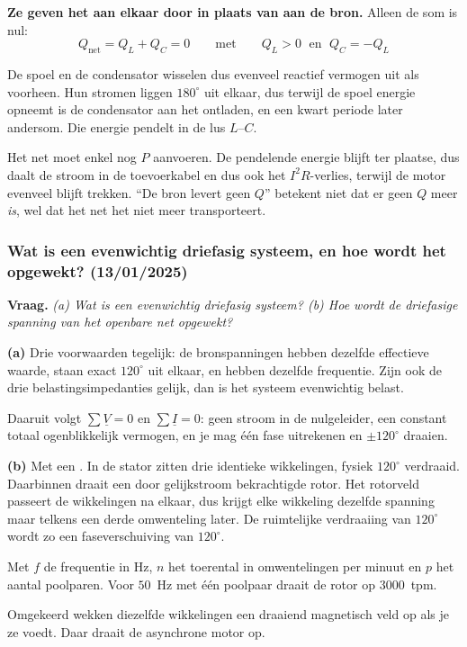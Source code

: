 \documentclass[a4paper,11pt]{article}
\begin{document}
\begin{oefenblok}[Antwoord]
    \textbf{Ze geven het aan elkaar door in plaats van aan de bron.} Alleen de som is nul:
    \[Q_{\text{net}} = Q_L + Q_C = 0 \qquad\text{met}\qquad Q_L > 0 \;\text{ en }\; Q_C = -Q_L\]

    De spoel en de condensator wisselen dus evenveel reactief vermogen uit als voorheen. Hun stromen
    liggen $180^\circ$ uit elkaar, dus terwijl de spoel energie opneemt is de condensator aan het
    ontladen, en een kwart periode later andersom. Die energie pendelt in de lus $L$--$C$.

    Het net moet enkel nog $P$ aanvoeren. De pendelende energie blijft ter plaatse, dus daalt de
    stroom in de toevoerkabel en dus ook het $I^2R$-verlies, terwijl de motor evenveel blijft
    trekken. ``De bron levert geen $Q$'' betekent niet dat er geen $Q$ meer \emph{is}, wel dat het
    net het niet meer transporteert.
\end{oefenblok}

\subsubsection{Wat is een evenwichtig driefasig systeem, en hoe wordt het opgewekt? (13/01/2025)}

\textbf{Vraag.} \textit{(a) Wat is een evenwichtig driefasig systeem? (b) Hoe wordt de driefasige
    spanning van het openbare net opgewekt?}

\begin{oefenblok}[Antwoord]
    \textbf{(a)} Drie voorwaarden tegelijk: de bronspanningen hebben dezelfde effectieve waarde,
    staan exact $120^\circ$ uit elkaar, en hebben dezelfde frequentie. Zijn ook de drie
    belastingsimpedanties gelijk, dan is het systeem evenwichtig belast.

    Daaruit volgt $\sum \underline{V} = 0$ en $\sum \underline{I} = 0$: geen stroom in de
    nulgeleider, een constant totaal ogenblikkelijk vermogen, en je mag \'e\'en fase uitrekenen en
    $\pm 120^\circ$ draaien.

    \textbf{(b)} Met een . In de stator zitten drie identieke
    wikkelingen, fysiek $120^\circ$ verdraaid. Daarbinnen draait een door gelijkstroom bekrachtigde
    rotor. Het rotorveld passeert de wikkelingen na elkaar, dus krijgt elke wikkeling dezelfde
    spanning maar telkens een derde omwenteling later. De ruimtelijke verdraaiing van $120^\circ$
    wordt zo een faseverschuiving van $120^\circ$.

    {Met $f$ de frequentie in Hz, $n$ het toerental in omwentelingen per minuut en $p$ het aantal
        poolparen. Voor $50$~Hz met \'e\'en poolpaar draait de rotor op $3000$~tpm.}

    Omgekeerd wekken diezelfde wikkelingen een draaiend magnetisch veld op als je ze voedt. Daar
    draait de asynchrone motor op.
\end{oefenblok}
\end{document}
